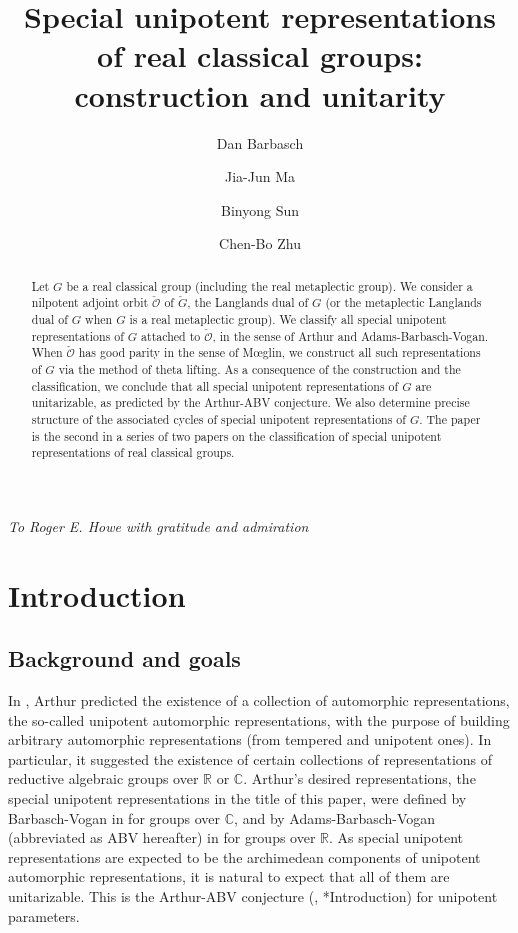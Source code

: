 \documentclass[11pt,a4paper]{amsart}
\title[Special unipotent representations]{Special unipotent representations of real classical groups: construction and unitarity}
\author [D. Barbasch] {Dan Barbasch}
\author [J.-J. Ma] {Jia-Jun Ma}
\author[B. Sun]{Binyong Sun}
\author [C.-B. Zhu] {Chen-Bo Zhu}
\newcommand{\BC}{{\mathbb {C}}}
\newcommand{\BR}{{\mathbb {R}}}
\numberwithin{equation}{section}
\theoremstyle{remark}
\begin{document}

\begin{abstract} 
Let $G$ be a real classical group (including the real metaplectic group). We consider a nilpotent adjoint orbit $\check{\mathcal O}$ of $\check G$, the Langlands dual of $G$ (or the metaplectic Langlands dual of $G$ when $G$ is a real metaplectic group). We classify all special unipotent representations of $G$ attached to $\check{\mathcal O}$, in the sense of Arthur and Adams-Barbasch-Vogan. When $\check{\mathcal O}$ has good parity in the sense of M{\oe}glin, we construct all such representations of $G$ via the method of theta lifting. As a consequence of the construction and the classification, we conclude that all special unipotent representations of $G$ are unitarizable, as predicted by the Arthur-ABV conjecture. We also determine precise structure of the associated cycles of special unipotent representations of $G$. The paper is the second in a series of two papers on the classification of special unipotent representations of real classical groups.
\end{abstract}


\maketitle

\hspace*{\fill}\emph{To Roger E. Howe with gratitude and admiration}\hspace*{\fill}

\vskip 20pt 

\tableofcontents


\section{Introduction}\label{sec:intro}

\subsection{Background and goals}
In \cite{ArPro, ArUni}, Arthur predicted the existence of a collection of automorphic representations, the so-called unipotent automorphic representations, with the purpose of building arbitrary automorphic representations (from tempered and unipotent ones). In particular, it suggested the existence of certain collections of representations of reductive algebraic groups over $\BR$ or $\BC$. Arthur’s desired representations, the special unipotent representations in the title of this paper, were defined by Barbasch-Vogan in \cite{BVUni} for groups over $\BC$, and by Adams-Barbasch-Vogan (abbreviated as ABV hereafter) in \cite[Chapter 27]{ABV} for groups over $\BR$.
As special unipotent representations are expected to be the archimedean components of unipotent automorphic representations, it is natural to expect that all of them are unitarizable. This is the Arthur-ABV conjecture (\cite[Section 4]{ArUni}, \cite{ABV}*{Introduction}) for unipotent parameters.
\end{document}
